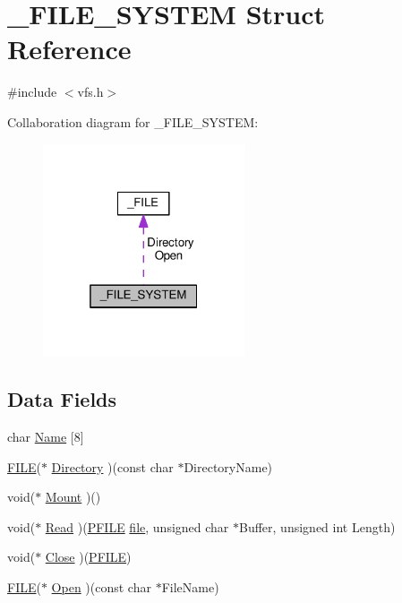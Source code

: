 \hypertarget{struct__FILE__SYSTEM}{}\section{\+\_\+\+F\+I\+L\+E\+\_\+\+S\+Y\+S\+T\+EM Struct Reference}
\label{struct__FILE__SYSTEM}


{\ttfamily \#include $<$vfs.\+h$>$}



Collaboration diagram for \+\_\+\+F\+I\+L\+E\+\_\+\+S\+Y\+S\+T\+EM\+:
\nopagebreak
\begin{figure}[H]
\begin{center}
\leavevmode
\includegraphics[width=169pt]{struct__FILE__SYSTEM__coll__graph}
\end{center}
\end{figure}
\subsection*{Data Fields}
\begin{DoxyCompactItemize}
\item 
char \hyperlink{struct__FILE__SYSTEM_a802d31f742c14deb2020c8bd6bcb4fdb}{Name} \mbox{[}8\mbox{]}
\item 
\hyperlink{vfs_8h_a175abb747ea3b78aa8da87355dcec473}{F\+I\+LE}($\ast$ \hyperlink{struct__FILE__SYSTEM_a96097c4b444cc7c7cd110f8f8c56ed55}{Directory} )(const char $\ast$Directory\+Name)
\item 
void($\ast$ \hyperlink{struct__FILE__SYSTEM_a5aa8d15979d91eec1ff97c4701594ff2}{Mount} )()
\item 
void($\ast$ \hyperlink{struct__FILE__SYSTEM_a24dcbcc9b82e7395aa6b15ef3e36413c}{Read} )(\hyperlink{vfs_8h_ad326c846895d1e06bc4c2228bf864968}{P\+F\+I\+LE} \hyperlink{structfile}{file}, unsigned char $\ast$Buffer, unsigned int Length)
\item 
void($\ast$ \hyperlink{struct__FILE__SYSTEM_a5595fce92d628028705b1ddd25d21e6f}{Close} )(\hyperlink{vfs_8h_ad326c846895d1e06bc4c2228bf864968}{P\+F\+I\+LE})
\item 
\hyperlink{vfs_8h_a175abb747ea3b78aa8da87355dcec473}{F\+I\+LE}($\ast$ \hyperlink{struct__FILE__SYSTEM_ae7183a7cfc938bbf1ed51aab2462b991}{Open} )(const char $\ast$File\+Name)
\end{DoxyCompactItemize}


